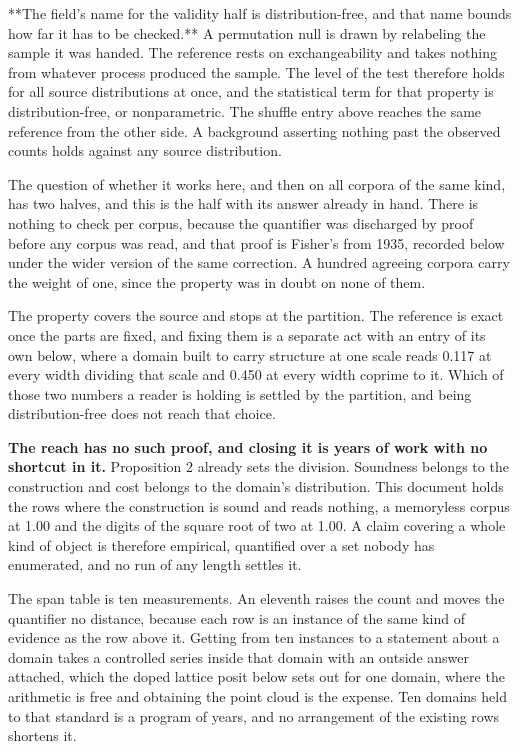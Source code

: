 **The field's name for the validity half is distribution-free, and that name bounds how far it has to be checked.** A permutation null is drawn by relabeling the sample it was handed. The reference rests on exchangeability and takes nothing from whatever process produced the sample. The level of the test therefore holds for all source distributions at once, and the statistical term for that property is distribution-free, or nonparametric. The shuffle entry above reaches the same reference from the other side. A background asserting nothing past the observed counts holds against any source distribution.

The question of whether it works here, and then on all corpora of the same kind, has two halves, and this is the half with its answer already in hand. There is nothing to check per corpus, because the quantifier was discharged by proof before any corpus was read, and that proof is Fisher's from 1935, recorded below under the wider version of the same correction. A hundred agreeing corpora carry the weight of one, since the property was in doubt on none of them.

The property covers the source and stops at the partition. The reference is exact once the parts are fixed, and fixing them is a separate act with an entry of its own below, where a domain built to carry structure at one scale reads 0.117 at every width dividing that scale and 0.450 at every width coprime to it. Which of those two numbers a reader is holding is settled by the partition, and being distribution-free does not reach that choice.

\textbf{The reach has no such proof, and closing it is years of work with no shortcut in it.} Proposition 2 already sets the division. Soundness belongs to the construction and cost belongs to the domain's distribution. This document holds the rows where the construction is sound and reads nothing, a memoryless corpus at 1.00 and the digits of the square root of two at 1.00. A claim covering a whole kind of object is therefore empirical, quantified over a set nobody has enumerated, and no run of any length settles it.

The span table is ten measurements. An eleventh raises the count and moves the quantifier no distance, because each row is an instance of the same kind of evidence as the row above it. Getting from ten instances to a statement about a domain takes a controlled series inside that domain with an outside answer attached, which the doped lattice posit below sets out for one domain, where the arithmetic is free and obtaining the point cloud is the expense. Ten domains held to that standard is a program of years, and no arrangement of the existing rows shortens it.

